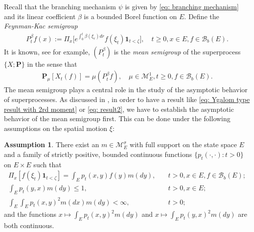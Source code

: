 \documentclass[12pt,a4paper]{amsart}
\theoremstyle{definition}
\newtheorem{asp}{Assumption}
\numberwithin{equation}{section}
\begin{document}
Recall that the branching mechanism $\psi$ is given by \eqref{eq: branching mechanism} and its linear coefficient $\beta$ is a bounded Borel function on $E$. Define the \emph{Feynman-Kac semigroup}
\begin{align}
  P^\beta_tf(x)
  := \Pi_x \big[e^{\int_0^{t} \beta(\xi_r)dr} f(\xi_t)\mathbf 1_{t<\zeta}\big],
  \quad t\geq 0, x\in E, f\in \mathscr B_b(E).
\end{align}
It is known, see \cite[Proposition 2.27]{Li2011Measure-valued} for example, $(P^\beta_t)$ is the \emph{mean semigroup} of the superprocess $\{X; \mathbf P\}$ in the sense that
\begin{align}
\label{eq:mean_formula}
	\mathbf P_\mu [X_t(f)]
	= \mu(P^\beta_t f),
	\quad \mu \in \mathcal M^1_E,
	t \geq 0,f \in \mathscr B_b(E).
\end{align}
The mean semigroup plays a central role in the study of the asymptotic behavior of superprocesses.
As discussed in \cite{EvansPerkins1990Measure-valued}, in order to have a result like \eqref{eq: Ygalom type result with 2rd moment} or \eqref{eq: result2}, we have to establish the asymptotic behavior of the mean semigroup first.
This can be done under the following assumptions on the spatial motion $\xi$:
\begin{asp} \label{asp: 1}
  There exist an $m \in \mathcal M_E^\sigma$ with full support on the state space $E$ and a family of strictly positive,
	bounded continuous functions $\{ p_t(\cdot,\cdot): t > 0 \}$ on $E \times E$ such that
  \begin{align}
    \Pi_x[ f(\xi_t)\mathbf 1_{t < \zeta} ]
    = \int_E p_t(x,y) f(y) m(dy),
    &\quad t>0, x \in E,f \in \mathscr B_b(E);
    \\\int_E p_t(y,x)m(dy)
    \leq 1,	
    &\quad t>0,x\in E;
    \\\int_E \int_E p_t(x,y)^2 m(dx) m(dy)
    <\infty,
    &\quad t> 0;
  \end{align}
	and the functions $x \mapsto \int_E p_t(x,y)^2 m(dy)$ and $x \mapsto \int_E p_t(y,x)^2 m(dy)$ are both continuous.
\end{asp}
\end{document}
